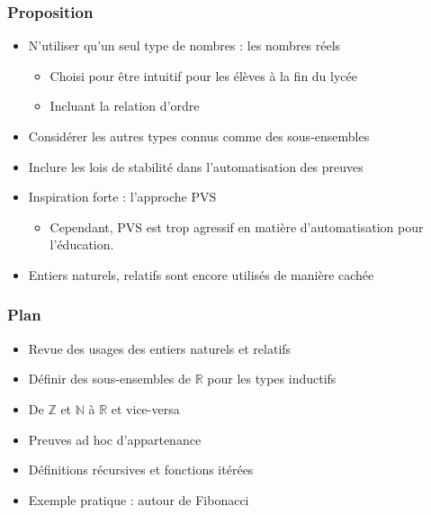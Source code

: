 \documentclass[compress]{beamer}
\begin{document}
\begin{frame}
\frametitle{Proposition}
\begin{itemize}
\item N'utiliser qu'un seul type de nombres : les nombres r\'eels
\begin{itemize}
\item Choisi pour \^etre intuitif pour les \'el\`eves \`a la fin du lyc\'ee
\item Incluant la relation d'ordre
\end{itemize}
\item Consid\'erer les autres types connus comme des sous-ensembles
\item Inclure les lois de stabilit\'e dans l'automatisation des preuves
\item Inspiration forte : l'approche PVS
\begin{itemize}
\item Cependant, PVS est trop agressif en mati\`ere d'automatisation pour l'\'education.
\end{itemize}
\item Entiers naturels, relatifs sont encore utilis\'es de mani\`ere cach\'ee
\end{itemize}
\end{frame}
\begin{frame}
\frametitle{Plan}
\begin{itemize}
\item Revue des usages des entiers naturels et relatifs
\item D\'efinir des sous-ensembles de \(\mathbb R\) pour les types inductifs
\item De \(\mathbb Z\) et \(\mathbb N\) \`a \(\mathbb R\) et vice-versa
\item Preuves ad hoc d'appartenance
\item D\'efinitions r\'ecursives et fonctions it\'er\'ees
\item Exemple pratique : autour de Fibonacci

\end{itemize}
\end{frame}
\end{document}
